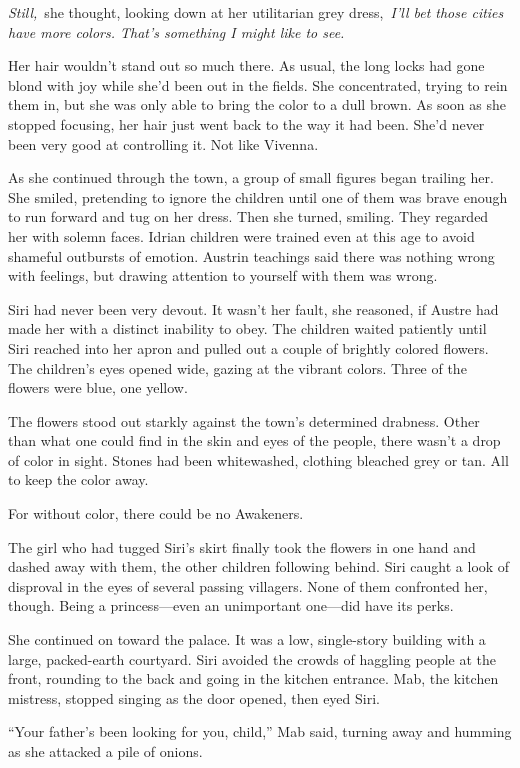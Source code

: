 \textit{Still,}~she thought, looking down at her utilitarian grey dress,~\textit{I’ll bet those cities have more colors. That’s something I might like to see.}

Her hair wouldn’t stand out so much there. As usual, the long locks had gone blond with joy while she’d been out in the fields. She concentrated, trying to rein them in, but she was only able to bring the color to a dull brown. As soon as she stopped focusing, her hair just went back to the way it had been. She’d never been very good at controlling it. Not like Vivenna.

As she continued through the town, a group of small figures began trailing her. She smiled, pretending to ignore the children until one of them was brave enough to run forward and tug on her dress. Then she turned, smiling. They regarded her with solemn faces. Idrian children were trained even at this age to avoid shameful outbursts of emotion. Austrin teachings said there was nothing wrong with feelings, but drawing attention to yourself with them was wrong.

Siri had never been very devout. It wasn’t her fault, she reasoned, if Austre had made her with a distinct inability to obey. The children waited patiently until Siri reached into her apron and pulled out a couple of brightly colored flowers. The children’s eyes opened wide, gazing at the vibrant colors. Three of the flowers were blue, one yellow.

The flowers stood out starkly against the town’s determined drabness. Other than what one could find in the skin and eyes of the people, there wasn’t a drop of color in sight. Stones had been whitewashed, clothing bleached grey or tan. All to keep the color away.

For without color, there could be no Awakeners.

The girl who had tugged Siri’s skirt finally took the flowers in one hand and dashed away with them, the other children following behind. Siri caught a look of disproval in the eyes of several passing villagers. None of them confronted her, though. Being a princess—even an unimportant one—did have its perks.

She continued on toward the palace. It was a low, single-story building with a large, packed-earth courtyard. Siri avoided the crowds of haggling people at the front, rounding to the back and going in the kitchen entrance. Mab, the kitchen mistress, stopped singing as the door opened, then eyed Siri.

“Your father’s been looking for you, child,” Mab said, turning away and humming as she attacked a pile of onions.

